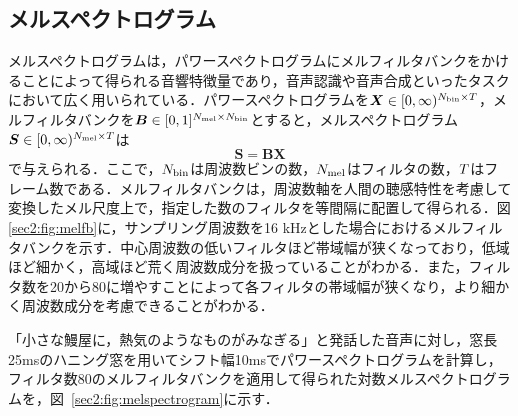 \subsection{メルスペクトログラム}
メルスペクトログラムは，パワースペクトログラムにメルフィルタバンクをかけることによって得られる音響特徴量であり，音声認識や音声合成といったタスクにおいて広く用いられている．パワースペクトログラムを$\bm{X} \in [0, \infty)^{N_{\text{bin}} \times T}$，メルフィルタバンクを$\bm{B} \in [0, 1]^{N_{\text{mel}} \times N_{\text{bin}}}$とすると，メルスペクトログラム$\bm{S} \in [0, \infty)^{N_{\text{mel}} \times T}$は
\begin{equation}
    \bm{S} = \bm{B} \bm{X}
\end{equation}
で与えられる．ここで，$N_{\text{bin}}$は周波数ビンの数，$N_{\text{mel}}$はフィルタの数，$T$はフレーム数である．メルフィルタバンクは，周波数軸を人間の聴感特性を考慮して変換したメル尺度上で，指定した数のフィルタを等間隔に配置して得られる．図\ref{sec2:fig:melfb}に，サンプリング周波数を16 kHzとした場合におけるメルフィルタバンクを示す．中心周波数の低いフィルタほど帯域幅が狭くなっており，低域ほど細かく，高域ほど荒く周波数成分を扱っていることがわかる．また，フィルタ数を20から80に増やすことによって各フィルタの帯域幅が狭くなり，より細かく周波数成分を考慮できることがわかる．

「小さな鰻屋に，熱気のようなものがみなぎる」と発話した音声に対し，窓長25msのハニング窓を用いてシフト幅10msでパワースペクトログラムを計算し，フィルタ数80のメルフィルタバンクを適用して得られた対数メルスペクトログラムを，図~\ref{sec2:fig:melspectrogram}に示す．

